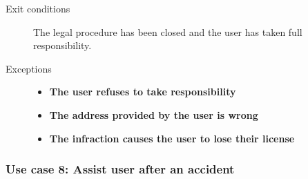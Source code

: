 \begin{description}
\begin{enumerate}
				\end{enumerate}
			\item[Exit conditions] The legal procedure has been closed and the user has taken full responsibility.
			\item[Exceptions] \hfill
				\begin{itemize} %
					\item \textbf{The user refuses to take responsibility}
					\item \textbf{The address provided by the user is wrong}
					\item \textbf{The infraction causes the user to lose their license}
				\end{itemize}
		\end{description}

	\subsubsection{Use case 8: Assist user after an accident}
